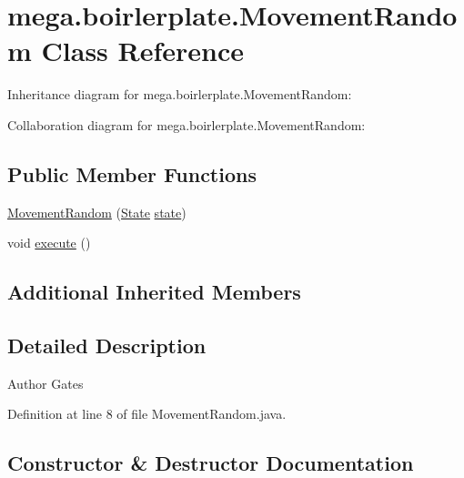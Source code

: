 \hypertarget{classmega_1_1boirlerplate_1_1_movement_random}{}\section{mega.\+boirlerplate.\+Movement\+Random Class Reference}
\label{classmega_1_1boirlerplate_1_1_movement_random}


Inheritance diagram for mega.\+boirlerplate.\+Movement\+Random\+:


Collaboration diagram for mega.\+boirlerplate.\+Movement\+Random\+:
\subsection*{Public Member Functions}
\begin{DoxyCompactItemize}
\item 
\hyperlink{classmega_1_1boirlerplate_1_1_movement_random_a6e9e60980e22f3f4727fd3632bed346b}{Movement\+Random} (\hyperlink{classmega_1_1boirlerplate_1_1_state}{State} \hyperlink{classmega_1_1boirlerplate_1_1_component_a87b0d70f323b5fee60a200e07c9c20fd}{state})
\item 
void \hyperlink{classmega_1_1boirlerplate_1_1_movement_random_a4a31d26a518a73f33211d0da4a384b12}{execute} ()
\end{DoxyCompactItemize}
\subsection*{Additional Inherited Members}


\subsection{Detailed Description}
\begin{DoxyAuthor}{Author}
Gates 
\end{DoxyAuthor}


Definition at line 8 of file Movement\+Random.\+java.



\subsection{Constructor \& Destructor Documentation}
\mbox{\label{classmega_1_1boirlerplate_1_1_movement_random_a6e9e60980e22f3f4727fd3632bed346b}} 

